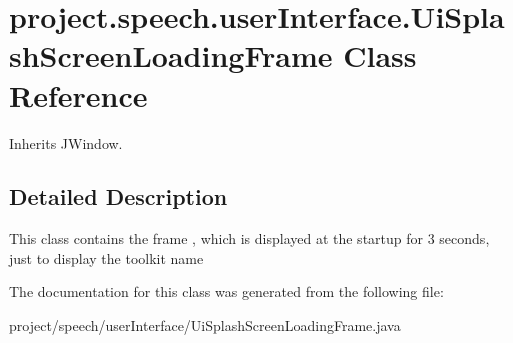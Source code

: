 \section{project.\+speech.\+user\+Interface.\+Ui\+Splash\+Screen\+Loading\+Frame Class Reference}
\label{classproject_1_1speech_1_1user_interface_1_1_ui_splash_screen_loading_frame}


Inherits J\+Window.



\subsection{Detailed Description}
This class contains the frame , which is displayed at the startup for 3 seconds, just to display the toolkit name 

The documentation for this class was generated from the following file\+:\begin{DoxyCompactItemize}
\item 
project/speech/user\+Interface/Ui\+Splash\+Screen\+Loading\+Frame.\+java\end{DoxyCompactItemize}
